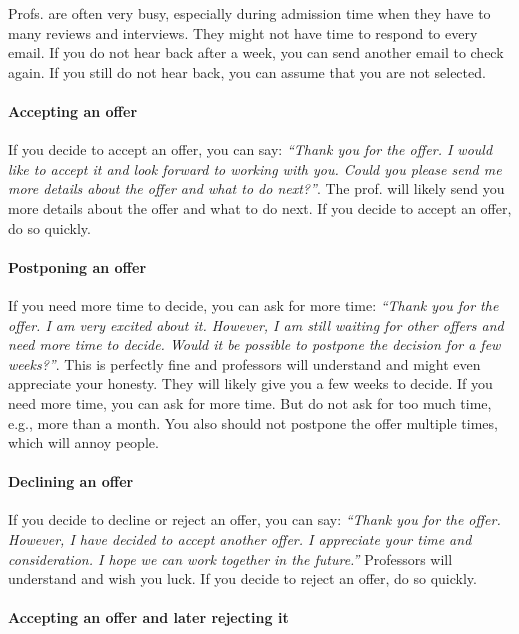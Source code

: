 \documentclass[oneside,11pt,dvipsnames]{book}
\begin{document}
Profs. are often very busy, especially during admission time when they have to many reviews and interviews.  They might not have time to respond to every email.  If you do not hear back after a week, you can send another email to check again.  If you still do not hear back, you can assume that you are not selected.

\paragraph{Accepting an offer} If you decide to accept an offer, you can say: \emph{``Thank you for the offer.  I would like to accept it and look forward to working with you.  Could you please send me more details about the offer and what to do next?''}. The prof. will likely send you more details about the offer and what to do next.  If you decide to accept an offer, do so quickly.



\paragraph{Postponing an offer} If you need more time to decide, you can ask for more time: \emph{``Thank you for the offer.  I am very excited about it.  However, I am still waiting for other offers and need more time to decide.  Would it be possible to postpone the decision for a few weeks?''}.  This is perfectly fine and professors will understand and might even appreciate your honesty.  They will likely give you a few weeks to decide.  If you need more time, you can ask for more time.  But do not ask for too much time, e.g., more than a month.  You also should not postpone the offer multiple times, which will annoy people.



\paragraph{Declining an offer} If you decide to decline or reject an offer, you can say: \emph{``Thank you for the offer. However, I have decided to accept another offer.  I appreciate your time and consideration.  I hope we can work together in the future.''}  Professors will understand and wish you luck.  If you decide to reject an offer, do so quickly.


\paragraph{Accepting an offer and later rejecting it}
\end{document}
